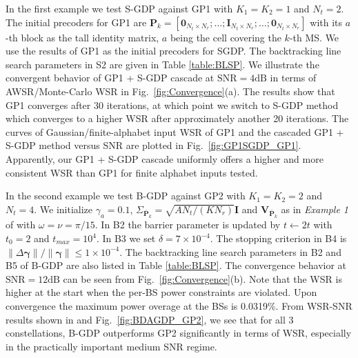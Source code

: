 \documentclass{article}
\begin{document}
In the first example we test S-GDP against GP1 with $K_1 = K_2 = 1$ and $N_t= 2$. The initial precoders for GP1
are $\mathbf{P}_k = [\mathbf{0}_{N_t\times N_r};\ldots;\mathbf{I}_{N_t\times N_r};\ldots;\mathbf{0}_{N_t\times N_r}]$ with its $a$-th block as the tall identity matrix, $a$ being the cell
covering the $k$-th MS.
We use the results of GP1 as the initial precoders for SGDP.
The backtracking line search parameters \cite{boyd2004convex} in S2 are given in Table \ref{table:BLSP}.
We illustrate the convergent behavior of GP1 + S-GDP cascade at $\mbox{SNR} = 4\mbox{dB}$ in terms of AWSR/Monte-Carlo WSR in Fig.~\ref{fig:Convergence}(a).
The results show that GP1 converges after $30$ iterations,
at which point we switch to S-GDP method which converges to a higher WSR after approximately another 20 iterations.
The curves of Gaussian/finite-alphabet input WSR of GP1 and the cascaded GP1 + S-GDP method versus SNR are plotted in Fig.~\ref{fig:GP1SGDP_GP1}.
Apparently, our GP1 + S-GDP cascade uniformly offers a higher and more consistent WSR than GP1 for finite alphabet inputs tested.

In the second example we test B-GDP against GP2 with $K_1 = K_2 = 2$ and $N_t= 4$. We
 initialize $\gamma_a=0.1$, $\Sigma_{\bar{\mathbf{P}}_k} = \sqrt{AN_t/(KN_r)}\mathbf{I}$ and $\mathbf{V}_{\bar{\mathbf{P}}_k}$ as
in \emph{Example 1} of \cite{xiao2011globally} with $\omega=\nu=\pi/15$. In B2 the barrier parameter is updated by $t\leftarrow 2t$ with $t_0=2$ and $t_{max} = 10^4$. In B3 we set $\delta = 7\times10^{-4}$.
The stopping criterion in B4 is $\|\Delta\bm{\gamma}\|/\|\bm{\gamma}\|\leq1\times10^{-4}$. The backtracking line search parameters in B2 and B5 of B-GDP are also listed in Table \ref{table:BLSP}.
The convergence behavior at $\mbox{SNR} = 12\mbox{dB}$ can be seen from Fig.~\ref{fig:Convergence}(b).
Note that the WSR is higher at the start when the per-BS power constraints are violated. Upon convergence the maximum power overage
at the BSs is 0.0319\%. From WSR-SNR results shown in  and Fig.~\ref{fig:BDAGDP_GP2}, we see that
for all 3 constellations, B-GDP outperforms GP2 significantly in terms of WSR, especially in the practically important medium SNR regime.
\end{document}
